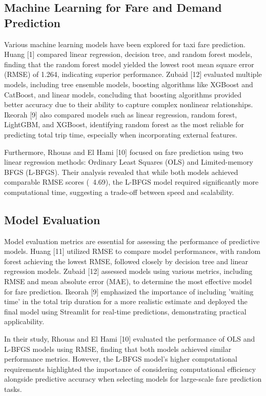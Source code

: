 \documentclass[conference]{IEEEtran}
\begin{document}
\subsection{Machine Learning for Fare and Demand Prediction}
Various machine learning models have been explored for taxi fare prediction. Huang [1] compared linear regression, decision tree, and random forest models, finding that the random forest model yielded the lowest root mean square error (RMSE) of 1.264, indicating superior performance. Zubaid [12] evaluated multiple models, including tree ensemble models, boosting algorithms like XGBoost and CatBoost, and linear models, concluding that boosting algorithms provided better accuracy due to their ability to capture complex nonlinear relationships. Ikeorah [9] also compared models such as linear regression, random forest, LightGBM, and XGBoost, identifying random forest as the most reliable for predicting total trip time, especially when incorporating external features.

Furthermore, Rhouas and El Hami [10] focused on fare prediction using two linear regression methods: Ordinary Least Squares (OLS) and Limited-memory BFGS (L-BFGS). Their analysis revealed that while both models achieved comparable RMSE scores (~4.69), the L-BFGS model required significantly more computational time, suggesting a trade-off between speed and scalability.

\subsection{Model Evaluation}
Model evaluation metrics are essential for assessing the performance of predictive models. Huang [11] utilized RMSE to compare model performances, with random forest achieving the lowest RMSE, followed closely by decision tree and linear regression models. Zubaid [12] assessed models using various metrics, including RMSE and mean absolute error (MAE), to determine the most effective model for fare prediction. Ikeorah [9] emphasized the importance of including 'waiting time' in the total trip duration for a more realistic estimate and deployed the final model using Streamlit for real-time predictions, demonstrating practical applicability.

In their study, Rhouas and El Hami [10] evaluated the performance of OLS and L-BFGS models using RMSE, finding that both models achieved similar performance metrics. However, the L-BFGS model's higher computational requirements highlighted the importance of considering computational efficiency alongside predictive accuracy when selecting models for large-scale fare prediction tasks.
\end{document}
